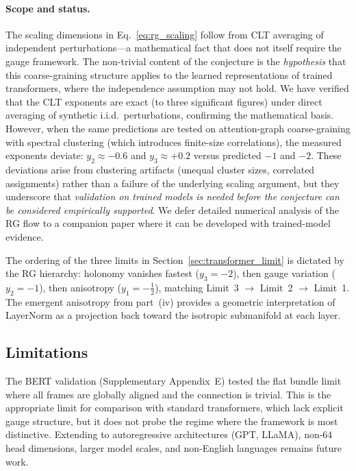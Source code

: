 \documentclass[twoside,11pt]{article}
\begin{document}
\paragraph{Scope and status.}
The scaling dimensions in Eq.~\eqref{eq:rg_scaling} follow from CLT averaging of independent perturbations---a mathematical fact that does not itself require the gauge framework. The non-trivial content of the conjecture is the \emph{hypothesis} that this coarse-graining structure applies to the learned representations of trained transformers, where the independence assumption may not hold. We have verified that the CLT exponents are exact (to three significant figures) under direct averaging of synthetic i.i.d.\ perturbations, confirming the mathematical basis. However, when the same predictions are tested on attention-graph coarse-graining with spectral clustering (which introduces finite-size correlations), the measured exponents deviate: $y_2 \approx -0.6$ and $y_3 \approx +0.2$ versus predicted $-1$ and $-2$. These deviations arise from clustering artifacts (unequal cluster sizes, correlated assignments) rather than a failure of the underlying scaling argument, but they underscore that \emph{validation on trained models is needed before the conjecture can be considered empirically supported}. We defer detailed numerical analysis of the RG flow to a companion paper where it can be developed with trained-model evidence.

The ordering of the three limits in Section~\ref{sec:transformer_limit} is dictated by the RG hierarchy: holonomy vanishes fastest ($y_3 = -2$), then gauge variation ($y_2 = -1$), then anisotropy ($y_1 = -\tfrac{1}{2}$), matching Limit~3 $\to$ Limit~2 $\to$ Limit~1. The emergent anisotropy from part~(iv) provides a geometric interpretation of LayerNorm as a projection back toward the isotropic submanifold at each layer.
\subsection{Limitations}

The BERT validation (Supplementary Appendix~E) tested the flat bundle limit where all frames are globally aligned and the connection is trivial. This is the appropriate limit for comparison with standard transformers, which lack explicit gauge structure, but it does not probe the regime where the framework is most distinctive. Extending to autoregressive architectures (GPT, LLaMA), non-64 head dimensions, larger model scales, and non-English languages remains future work.
\end{document}
